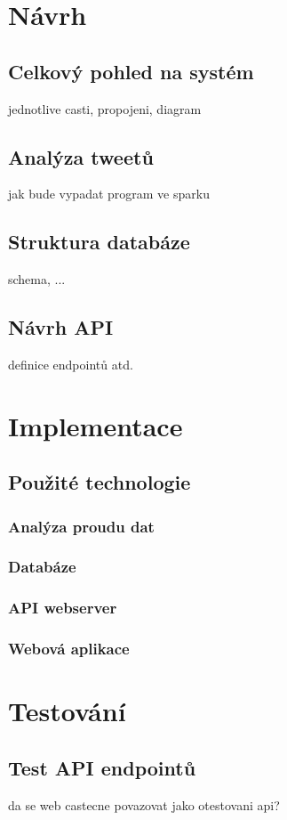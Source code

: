 \documentclass[thesis=B,czech]{FITthesis}[2012/06/26]
\begin{document}
\chapter{Návrh}
\section{Celkový pohled na systém}
	jednotlive casti, propojeni, diagram 
\section{Analýza tweetů}
	jak bude vypadat program ve sparku
\section{Struktura databáze}
	schema, ...
\section{Návrh API}
	definice endpointů atd.

\chapter{Implementace}
\section{Použité technologie}
\subsection{Analýza proudu dat}
\subsection{Databáze}
\subsection{API webserver}
\subsection{Webová aplikace}

\chapter{Testování}
\section{Test API endpointů}
	da se web castecne povazovat jako otestovani api?
\end{document}
